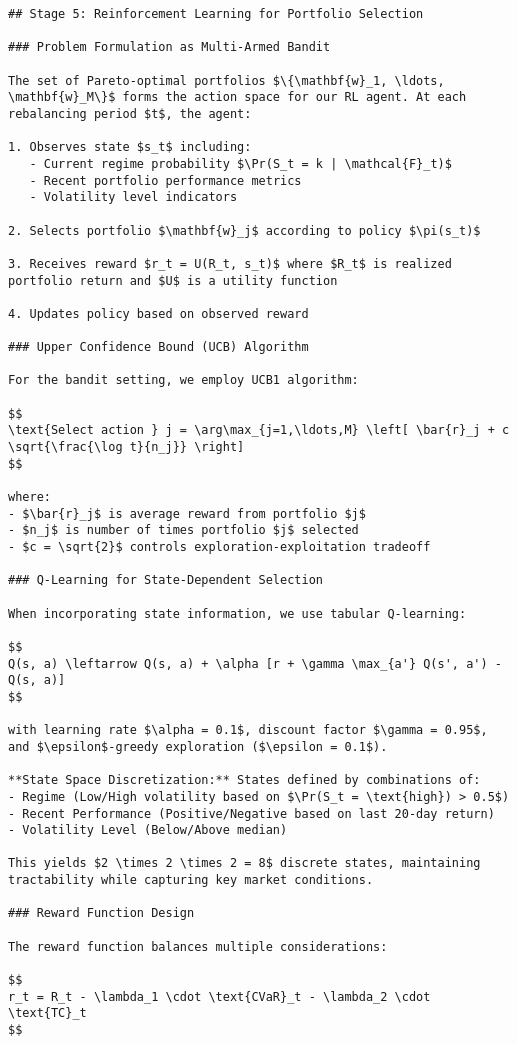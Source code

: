 \documentclass[
  10pt,
  a4paper,
]{article}
\begin{document}
\begin{tcolorbox}
\begin{verbatim}
## Stage 5: Reinforcement Learning for Portfolio Selection

### Problem Formulation as Multi-Armed Bandit

The set of Pareto-optimal portfolios $\{\mathbf{w}_1, \ldots, \mathbf{w}_M\}$ forms the action space for our RL agent. At each rebalancing period $t$, the agent:

1. Observes state $s_t$ including:
   - Current regime probability $\Pr(S_t = k | \mathcal{F}_t)$
   - Recent portfolio performance metrics
   - Volatility level indicators
   
2. Selects portfolio $\mathbf{w}_j$ according to policy $\pi(s_t)$

3. Receives reward $r_t = U(R_t, s_t)$ where $R_t$ is realized portfolio return and $U$ is a utility function

4. Updates policy based on observed reward

### Upper Confidence Bound (UCB) Algorithm

For the bandit setting, we employ UCB1 algorithm:

$$
\text{Select action } j = \arg\max_{j=1,\ldots,M} \left[ \bar{r}_j + c \sqrt{\frac{\log t}{n_j}} \right]
$$

where:
- $\bar{r}_j$ is average reward from portfolio $j$
- $n_j$ is number of times portfolio $j$ selected
- $c = \sqrt{2}$ controls exploration-exploitation tradeoff

### Q-Learning for State-Dependent Selection

When incorporating state information, we use tabular Q-learning:

$$
Q(s, a) \leftarrow Q(s, a) + \alpha [r + \gamma \max_{a'} Q(s', a') - Q(s, a)]
$$

with learning rate $\alpha = 0.1$, discount factor $\gamma = 0.95$, and $\epsilon$-greedy exploration ($\epsilon = 0.1$).

**State Space Discretization:** States defined by combinations of:
- Regime (Low/High volatility based on $\Pr(S_t = \text{high}) > 0.5$)
- Recent Performance (Positive/Negative based on last 20-day return)
- Volatility Level (Below/Above median)

This yields $2 \times 2 \times 2 = 8$ discrete states, maintaining tractability while capturing key market conditions.

### Reward Function Design

The reward function balances multiple considerations:

$$
r_t = R_t - \lambda_1 \cdot \text{CVaR}_t - \lambda_2 \cdot \text{TC}_t
$$


\end{verbatim}
\end{tcolorbox}
\end{document}
